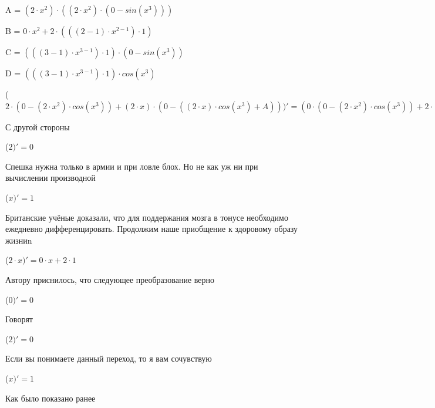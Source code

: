 \documentclass[12pt,a4paper,fleqn]{article}
\begin{document}
\begin{center}
A = $(2 \cdot x^{2}) \cdot ((2 \cdot x^{2}) \cdot (0-sin(x^{3})))$\end{center}
\begin{center}
B = $0 \cdot x^{2}+2 \cdot (((2-1) \cdot x^{2-1}) \cdot 1)$\end{center}
\begin{center}
C = $(((3-1) \cdot x^{3-1}) \cdot 1) \cdot (0-sin(x^{3}))$\end{center}
\begin{center}
D = $(((3-1) \cdot x^{3-1}) \cdot 1) \cdot cos(x^{3})$\end{center}
\begin{center}
 ($2 \cdot (0-(2 \cdot x^{2}) \cdot cos(x^{3}))+(2 \cdot x) \cdot (0-((2 \cdot x) \cdot cos(x^{3})+A)))'
  = (0 \cdot (0-(2 \cdot x^{2}) \cdot cos(x^{3}))+2 \cdot (0-((B) \cdot cos(x^{3})+(2 \cdot x^{2}) \cdot (C))))+((0 \cdot x+2 \cdot 1) \cdot (0-((2 \cdot x) \cdot cos(x^{3})+A))+(2 \cdot x) \cdot (0-(((0 \cdot x+2 \cdot 1) \cdot cos(x^{3})+(2 \cdot x) \cdot (C))+((B) \cdot ((2 \cdot x^{2}) \cdot (0-sin(x^{3})))+(2 \cdot x^{2}) \cdot ((B) \cdot (0-sin(x^{3}))+(2 \cdot x^{2}) \cdot (0-D))))))$\end{center}
С другой стороны

\begin{center}
 ($2)'
  = 0$\end{center}
Спешка нужна только в армии и при ловле блох. Но не как уж ни при вычислении производной\cite{link2}

\begin{center}
 ($x)'
  = 1$\end{center}
Британские учёные доказали, что для поддержания мозга в тонусе необходимо ежедневно дифференцировать. Продолжим наше приобщение к здоровому образу жизниn

\begin{center}
 ($2 \cdot x)'
  = 0 \cdot x+2 \cdot 1$\end{center}
Автору приснилось, что следующее преобразование верно

\begin{center}
 ($0)'
  = 0$\end{center}
Говорят

\begin{center}
 ($2)'
  = 0$\end{center}
Если вы понимаете данный переход, то я вам сочувствую

\begin{center}
 ($x)'
  = 1$\end{center}
Как было показано ранее
\end{document}
